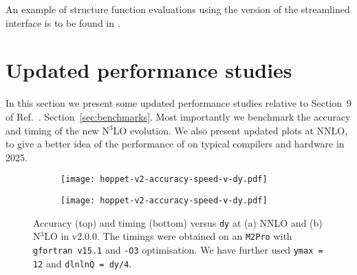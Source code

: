 An example of structure function evaluations using the \CPP{} version of
the streamlined interface is to be found in
.
%

\section{Updated performance studies}
In this section we present some updated performance studies relative
to
%
\ifreleasenote
Section~9 of Ref.~\cite{Salam:2008qg}.
\else
Section~\ref{sec:benchmarks}.
\fi
%
Most importantly we benchmark the accuracy and timing of the new
N$^3$LO evolution. We also present updated plots at NNLO, to give a
better idea of the performance of \hoppet{} on typical compilers and
hardware in 2025.

\begin{figure}[htbp]
    \centering
    \begin{subfigure}{0.49\textwidth}
        \centering
        \texttt{[image: hoppet-v2-accuracy-speed-v-dy.pdf]}
        \caption{}
        \label{fig:sub1}
    \end{subfigure}
    \hfill
    \begin{subfigure}{0.49\textwidth}
        \centering
        \texttt{[image: hoppet-v2-accuracy-speed-v-dy.pdf]}
        \caption{}
        \label{fig:sub2}
    \end{subfigure}
    \caption{Accuracy (top) and timing (bottom) versus \texttt{dy} at
      (a) NNLO and (b) N$^3$LO in \hoppet{} v2.0.0. The timings were
      obtained on an \texttt{M2Pro} with \texttt{gfortran v15.1} and
      \texttt{-O3} optimisation. We have further used \texttt{ymax = 12} and
      \texttt{dlnlnQ = dy/4}.
    }
    \label{fig:main}
\end{figure}

